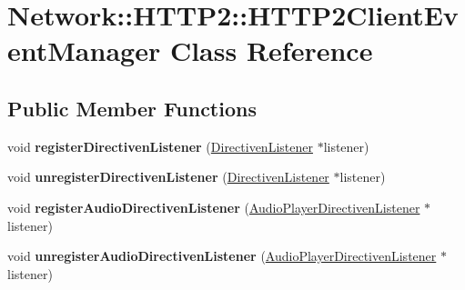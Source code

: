 \hypertarget{classNetwork_1_1HTTP2_1_1HTTP2ClientEventManager}{}\section{Network\+:\+:H\+T\+T\+P2\+:\+:H\+T\+T\+P2\+Client\+Event\+Manager Class Reference}
\label{classNetwork_1_1HTTP2_1_1HTTP2ClientEventManager}
\subsection*{Public Member Functions}
\begin{DoxyCompactItemize}
\item 
\mbox{\label{classNetwork_1_1HTTP2_1_1HTTP2ClientEventManager_a2fa38d058afbe4f01c86703df523e702}} 
void {\bfseries register\+Directiven\+Listener} (\hyperlink{classNetwork_1_1HTTP_1_1DirectivenListener}{Directiven\+Listener} $\ast$listener)
\item 
\mbox{\label{classNetwork_1_1HTTP2_1_1HTTP2ClientEventManager_a7c619296724ac41e95769239aa2cb50f}} 
void {\bfseries unregister\+Directiven\+Listener} (\hyperlink{classNetwork_1_1HTTP_1_1DirectivenListener}{Directiven\+Listener} $\ast$listener)
\item 
\mbox{\label{classNetwork_1_1HTTP2_1_1HTTP2ClientEventManager_afc79100de7cc9d8e4f5712b57b605f90}} 
void {\bfseries register\+Audio\+Directiven\+Listener} (\hyperlink{classNetwork_1_1HTTP_1_1AudioPlayerDirectivenListener}{Audio\+Player\+Directiven\+Listener} $\ast$listener)
\item 
\mbox{\label{classNetwork_1_1HTTP2_1_1HTTP2ClientEventManager_ab42d414c770b66f56b47abfcd5f5428c}} 
void {\bfseries unregister\+Audio\+Directiven\+Listener} (\hyperlink{classNetwork_1_1HTTP_1_1AudioPlayerDirectivenListener}{Audio\+Player\+Directiven\+Listener} $\ast$listener)
\item 
\mbox{\label{classNetwork_1_1HTTP2_1_1HTTP2ClientEventManager_ab0dcc078f1500f69903d9956ec50cf20}} 

\end{DoxyCompactItemize}
